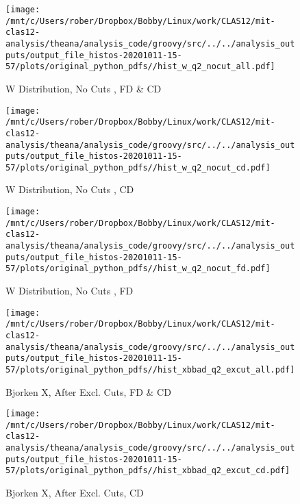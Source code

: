 \documentclass{article}
\begin{document}
\begin{landscape}
    \begin{figure}[h]
        \centering

        \texttt{[image: /mnt/c/Users/rober/Dropbox/Bobby/Linux/work/CLAS12/mit-clas12-analysis/theana/analysis\_code/groovy/src/../../analysis\_outputs/output\_file\_histos-20201011-15-57/plots/original\_python\_pdfs//hist\_w\_q2\_nocut\_all.pdf]}
        \captionsetup{textformat=empty,labelformat=blank}
        \caption{W Distribution, No Cuts , FD \& CD}
    \end{figure}
    \clearpage
    
    \begin{figure}[h]
        \centering

        \texttt{[image: /mnt/c/Users/rober/Dropbox/Bobby/Linux/work/CLAS12/mit-clas12-analysis/theana/analysis\_code/groovy/src/../../analysis\_outputs/output\_file\_histos-20201011-15-57/plots/original\_python\_pdfs//hist\_w\_q2\_nocut\_cd.pdf]}
        \captionsetup{textformat=empty,labelformat=blank}
        \caption{W Distribution, No Cuts , CD}
    \end{figure}
    \clearpage
    
    \begin{figure}[h]
        \centering

        \texttt{[image: /mnt/c/Users/rober/Dropbox/Bobby/Linux/work/CLAS12/mit-clas12-analysis/theana/analysis\_code/groovy/src/../../analysis\_outputs/output\_file\_histos-20201011-15-57/plots/original\_python\_pdfs//hist\_w\_q2\_nocut\_fd.pdf]}
        \captionsetup{textformat=empty,labelformat=blank}
        \caption{W Distribution, No Cuts , FD}
    \end{figure}
    \clearpage
    
    \begin{figure}[h]
        \centering

        \texttt{[image: /mnt/c/Users/rober/Dropbox/Bobby/Linux/work/CLAS12/mit-clas12-analysis/theana/analysis\_code/groovy/src/../../analysis\_outputs/output\_file\_histos-20201011-15-57/plots/original\_python\_pdfs//hist\_xbbad\_q2\_excut\_all.pdf]}
        \captionsetup{textformat=empty,labelformat=blank}
        \caption{Bjorken X, After Excl. Cuts, FD \& CD}
    \end{figure}
    \clearpage
    
    \begin{figure}[h]
        \centering

        \texttt{[image: /mnt/c/Users/rober/Dropbox/Bobby/Linux/work/CLAS12/mit-clas12-analysis/theana/analysis\_code/groovy/src/../../analysis\_outputs/output\_file\_histos-20201011-15-57/plots/original\_python\_pdfs//hist\_xbbad\_q2\_excut\_cd.pdf]}
        \captionsetup{textformat=empty,labelformat=blank}
        \caption{Bjorken X, After Excl. Cuts, CD}
    \end{figure}
    \clearpage
    

\end{landscape}
\end{document}
